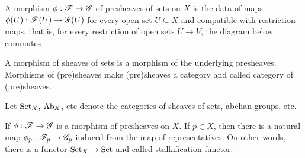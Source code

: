 \begin{definition}
	A morphism $\phi: \mathscr{F} \to \mathscr{G}$ of presheaves of sets on $X$ is the data of maps $\phi(U): \mathscr{F}(U) \to \mathscr{G}(U)$ for every open set $U \subseteq X$ and compatible with restriction maps, that is, for every restriction of open sets $U \to V$, the diagram below commutes
	\begin{center}
	\end{center}
	
	A morphism of sheaves of sets is a morphism of the underlying presheaves. Morphisms of (pre)sheaves make (pre)sheaves a category and called category of (pre)sheaves.
	
	Let $\operatorname{Set}_X$, $\operatorname{Ab}_X$, etc denote the categories of sheaves of sets, abelian groups, etc.
\end{definition}

\begin{proposition}
	If $\phi: \mathscr{F} \to \mathscr{G}$ is a morphism of presheaves on $X$. If $p \in X$, then there is a natural map $\phi_p: \mathscr{F}_p \to \mathscr{G}_p$ induced from the map of representatives. On other words, there is a functor $\operatorname{Set}_X \to \operatorname{Set}$ and called stalkification functor.
\end{proposition}

